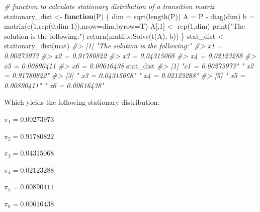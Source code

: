 \documentclass[
]{article}
\newenvironment{Shaded}{\begin{snugshade}}{\end{snugshade}}
\newcommand{\AttributeTok}[1]{\textcolor[rgb]{0.77,0.63,0.00}{#1}}
\newcommand{\CommentTok}[1]{\textcolor[rgb]{0.56,0.35,0.01}{\textit{#1}}}
\newcommand{\ControlFlowTok}[1]{\textcolor[rgb]{0.13,0.29,0.53}{\textbf{#1}}}
\newcommand{\DecValTok}[1]{\textcolor[rgb]{0.00,0.00,0.81}{#1}}
\newcommand{\FunctionTok}[1]{\textcolor[rgb]{0.00,0.00,0.00}{#1}}
\newcommand{\NormalTok}[1]{#1}
\newcommand{\OtherTok}[1]{\textcolor[rgb]{0.56,0.35,0.01}{#1}}
\newcommand{\SpecialCharTok}[1]{\textcolor[rgb]{0.00,0.00,0.00}{#1}}
\newcommand{\StringTok}[1]{\textcolor[rgb]{0.31,0.60,0.02}{#1}}
\begin{document}
\begin{Shaded}
\begin{Highlighting}[]
\CommentTok{\# function to calculate stationary distribution of a transition matrix}
\NormalTok{stationary\_dist }\OtherTok{\textless{}{-}} \ControlFlowTok{function}\NormalTok{(P) \{}
\NormalTok{    dim }\OtherTok{=} \FunctionTok{sqrt}\NormalTok{(}\FunctionTok{length}\NormalTok{(P))}
\NormalTok{    A }\OtherTok{=}\NormalTok{ P }\SpecialCharTok{{-}} \FunctionTok{diag}\NormalTok{(dim)}
\NormalTok{    b }\OtherTok{=} \FunctionTok{matrix}\NormalTok{(}\FunctionTok{c}\NormalTok{(}\DecValTok{1}\NormalTok{,}\FunctionTok{rep}\NormalTok{(}\DecValTok{0}\NormalTok{,dim}\DecValTok{{-}1}\NormalTok{)),}\AttributeTok{nrow=}\NormalTok{dim,}\AttributeTok{byrow=}\NormalTok{T)}
\NormalTok{    A[,}\DecValTok{1}\NormalTok{] }\OtherTok{\textless{}{-}} \FunctionTok{rep}\NormalTok{(}\DecValTok{1}\NormalTok{,dim)}
    \FunctionTok{print}\NormalTok{(}\StringTok{"The solution is the following:"}\NormalTok{)}
    \FunctionTok{return}\NormalTok{(matlib}\SpecialCharTok{::}\FunctionTok{Solve}\NormalTok{(}\FunctionTok{t}\NormalTok{(A), b))}
\NormalTok{\}}
\NormalTok{stat\_dist }\OtherTok{\textless{}{-}} \FunctionTok{stationary\_dist}\NormalTok{(mat)}
\CommentTok{\#\textgreater{} [1] "The solution is the following:"}
\CommentTok{\#\textgreater{} x1            =  0.00273973 }
\CommentTok{\#\textgreater{}   x2          =  0.91780822 }
\CommentTok{\#\textgreater{}     x3        =  0.04315068 }
\CommentTok{\#\textgreater{}       x4      =  0.02123288 }
\CommentTok{\#\textgreater{}         x5    =  0.00890411 }
\CommentTok{\#\textgreater{}           x6  =  0.00616438}
\NormalTok{stat\_dist}
\CommentTok{\#\textgreater{} [1] "x1            =  0.00273973" "  x2          =  0.91780822"}
\CommentTok{\#\textgreater{} [3] "    x3        =  0.04315068" "      x4      =  0.02123288"}
\CommentTok{\#\textgreater{} [5] "        x5    =  0.00890411" "          x6  =  0.00616438"}
\end{Highlighting}
\end{Shaded}

Which yields the following stationary distribution:

\(\pi_{1} = 0.00273973\)

\(\pi_{2} = 0.91780822\)

\(\pi_{3} = 0.04315068\)

\(\pi_{4} = 0.02123288\)

\(\pi_{5} = 0.00890411\)

\(\pi_{6} = 0.00616438\)
\end{document}
